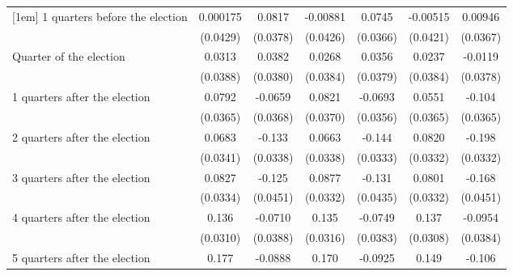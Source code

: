 \begin{table}[htbp]
\begin{tabular}{l*{6}{c}}
[1em]
 1 quarters before the election&    0.000175         &      0.0817\sym{*}  &    -0.00881         &      0.0745\sym{*}  &    -0.00515         &     0.00946         \\
                    &    (0.0429)         &    (0.0378)         &    (0.0426)         &    (0.0366)         &    (0.0421)         &    (0.0367)         \\
[1em]
Quarter of the election&      0.0313         &      0.0382         &      0.0268         &      0.0356         &      0.0237         &     -0.0119         \\
                    &    (0.0388)         &    (0.0380)         &    (0.0384)         &    (0.0379)         &    (0.0384)         &    (0.0378)         \\
[1em]
 1 quarters after the election&      0.0792\sym{*}  &     -0.0659         &      0.0821\sym{*}  &     -0.0693         &      0.0551         &      -0.104\sym{**} \\
                    &    (0.0365)         &    (0.0368)         &    (0.0370)         &    (0.0356)         &    (0.0365)         &    (0.0365)         \\
[1em]
 2 quarters after the election&      0.0683\sym{*}  &      -0.133\sym{***}&      0.0663\sym{*}  &      -0.144\sym{***}&      0.0820\sym{*}  &      -0.198\sym{***}\\
                    &    (0.0341)         &    (0.0338)         &    (0.0338)         &    (0.0333)         &    (0.0332)         &    (0.0332)         \\
[1em]
 3 quarters after the election&      0.0827\sym{*}  &      -0.125\sym{**} &      0.0877\sym{**} &      -0.131\sym{**} &      0.0801\sym{*}  &      -0.168\sym{***}\\
                    &    (0.0334)         &    (0.0451)         &    (0.0332)         &    (0.0435)         &    (0.0332)         &    (0.0451)         \\
[1em]
 4 quarters after the election&       0.136\sym{***}&     -0.0710         &       0.135\sym{***}&     -0.0749         &       0.137\sym{***}&     -0.0954\sym{*}  \\
                    &    (0.0310)         &    (0.0388)         &    (0.0316)         &    (0.0383)         &    (0.0308)         &    (0.0384)         \\
[1em]
 5 quarters after the election&       0.177\sym{***}&     -0.0888\sym{*}  &       0.170\sym{***}&     -0.0925\sym{**} &       0.149\sym{***}&      -0.106\sym{**} \\

\end{tabular}
\end{table}
